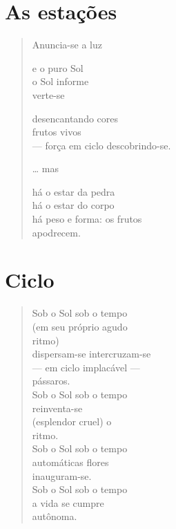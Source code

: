 \chapter{As estações}

\begin{verse}
Anuncia-se a luz

e o puro Sol\\
o Sol informe\\
verte-se

\quad\quad\quad{}desencantando cores\\
\quad\quad\quad{}frutos vivos\\
\quad\quad\quad{}--- força em ciclo descobrindo-se.

\quad\quad\quad\quad{}\ldots{} mas

\quad\quad\quad\quad\quad{}há o estar da pedra\\
\quad\quad\quad\quad\quad{}há o estar do corpo\\
\quad\quad\quad\quad\quad{}há peso e forma: os frutos\\
\hfill{}apodrecem.
\end{verse}

\chapter{Ciclo}

\begin{verse}
Sob o Sol \hfill sob o tempo\\
\quad\quad\quad(em seu próprio agudo\\
\quad\quad\quad\quad\quad\quad ritmo)\\
dispersam-se \hfill intercruzam-se\\
\quad\quad\quad--- em ciclo implacável ---\\
 \quad\quad\quad\quad\quad\quad pássaros.\\
Sob o Sol \hfill sob o tempo\\
\quad\quad\quad reinventa-se\\
\quad\quad\quad (esplendor cruel) o\\
\quad\quad\quad ritmo.\\
Sob o Sol \hfill sob o tempo\\
\quad\quad\quad automáticas flores\\
\quad\quad inauguram-se.\\
Sob o Sol \hfill sob o tempo\\
\quad\quad\quad a vida se cumpre\\
\quad\quad\quad autônoma.
\end{verse}

